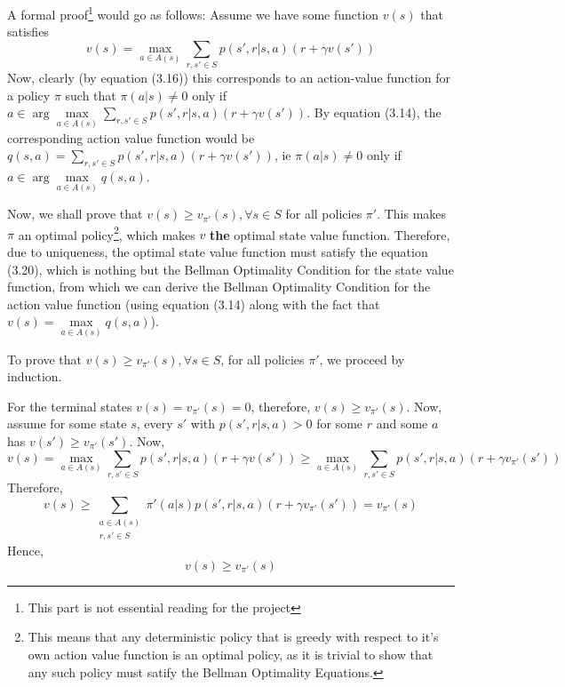 \documentclass[12pt]{report}
\begin{document}
A formal proof\footnote{This part is not essential reading for the project} would go as follows:
Assume we have some function $v(s)$ that satisfies
\begin{equation}
    v(s) = \max_{a \in A(s)} \sum\limits_{r, s' \in S} p(s', r | s, a) (r + \gamma v(s'))
\end{equation}
Now, clearly (by equation (3.16)) this corresponds to an action-value function for a policy $\pi$ such that $\pi(a | s) \neq 0$ only if $a \in \arg\max\limits_{a \in A(s)} \sum\limits_{r, s' \in S} p(s', r | s, a) (r + \gamma v(s'))$. 
By equation (3.14), the corresponding action value function would be $q(s, a) = \sum\limits_{r, s' \in S} p(s', r | s, a) (r + \gamma v(s'))$, ie $\pi(a | s) \neq 0$ only if $a \in \arg\max\limits_{a \in A(s)} q(s, a)$.

Now, we shall prove that $v(s) \geq v_{\pi'}(s), \forall s \in S$ for all policies $\pi'$. This  makes $\pi$ an optimal policy\footnote{This means that any deterministic policy that is greedy with respect to it's own action value function is an optimal policy, as it is trivial to show that any such policy must satify the Bellman Optimality Equations.}, which makes $v$ \textbf{the} optimal state value function.
Therefore, due to uniqueness, the optimal state value function must satisfy the equation (3.20), which is nothing but the Bellman Optimality Condition for the state value function, from which we can derive the Bellman Optimality Condition for the action value function (using equation (3.14) along with the fact that $v(s) = \max\limits_{a \in A(s)} q(s, a)$).

To prove that $v(s) \geq v_{\pi'}(s), \forall s \in S$, for all policies $\pi'$, we proceed by induction.

For the terminal states $v(s) = v_{\pi'}(s) = 0$, therefore, $v(s) \geq v_{\pi'}(s)$. Now, assume for some state $s$, every $s'$ with $p(s', r | s, a) > 0$ for some $r$ and some $a$ has $v(s') \geq v_{\pi'}(s')$.
Now,
\begin{equation}
    v(s) = \max_{a \in A(s)} \sum\limits_{r, s' \in S} p(s', r | s, a) (r + \gamma v(s')) \geq \max_{a \in A(s)} \sum\limits_{r, s' \in S} p(s', r | s, a) (r + \gamma v_{\pi'}(s'))
\end{equation}
Therefore,
\begin{equation}
    v(s) \geq \sum\limits_{\substack{a \in A(s)\\r, s' \in S}} \pi'(a | s) p(s', r | s, a) (r + \gamma v_{\pi'}(s')) = v_{\pi'}(s)
\end{equation}
Hence,
\begin{equation}
    v(s) \geq v_{\pi'}(s)
\end{equation}
\end{document}
